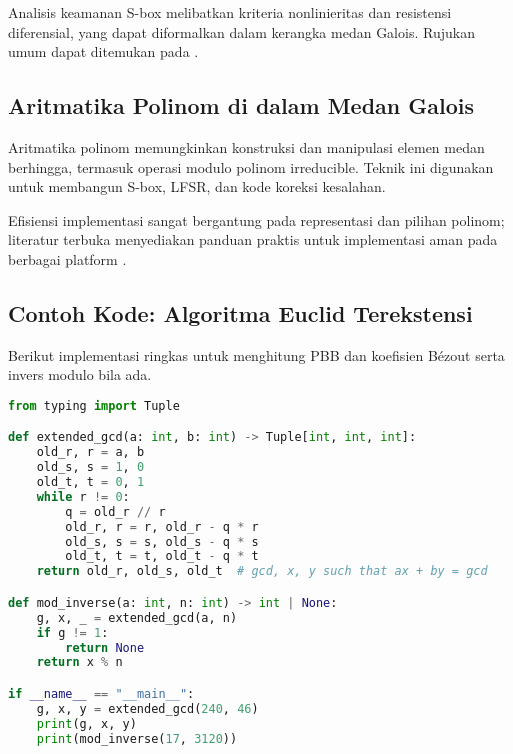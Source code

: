 \documentclass[../main.tex]{subfiles}
\begin{document}
Analisis keamanan S-box melibatkan kriteria nonlinieritas dan resistensi diferensial, yang dapat diformalkan dalam kerangka medan Galois. Rujukan umum dapat ditemukan pada \textcite{menezes1996handbook}.

\subsection{Aritmatika Polinom di dalam Medan Galois}
Aritmatika polinom memungkinkan konstruksi dan manipulasi elemen medan berhingga, termasuk operasi modulo polinom irreducible. Teknik ini digunakan untuk membangun S-box, LFSR, dan kode koreksi kesalahan.

Efisiensi implementasi sangat bergantung pada representasi dan pilihan polinom; literatur terbuka menyediakan panduan praktis untuk implementasi aman pada berbagai platform \parencite{menezes1996handbook}.

\subsection{Contoh Kode: Algoritma Euclid Terekstensi}
Berikut implementasi ringkas untuk menghitung PBB dan koefisien Bézout serta invers modulo bila ada.

\begin{lstlisting}[language=Python, caption={Extended Euclid dan invers modulo}, label={lst:eea}]
from typing import Tuple

def extended_gcd(a: int, b: int) -> Tuple[int, int, int]:
    old_r, r = a, b
    old_s, s = 1, 0
    old_t, t = 0, 1
    while r != 0:
        q = old_r // r
        old_r, r = r, old_r - q * r
        old_s, s = s, old_s - q * s
        old_t, t = t, old_t - q * t
    return old_r, old_s, old_t  # gcd, x, y such that ax + by = gcd

def mod_inverse(a: int, n: int) -> int | None:
    g, x, _ = extended_gcd(a, n)
    if g != 1:
        return None
    return x % n

if __name__ == "__main__":
    g, x, y = extended_gcd(240, 46)
    print(g, x, y)
    print(mod_inverse(17, 3120))
\end{lstlisting}
\end{document}
